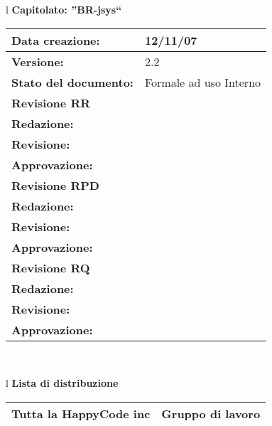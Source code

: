 

\newcommand{\lv}{ 2.2 } %
\newcommand{\dt}{ Norme Di Progetto }%



\begin{center}
\thispagestyle{plain}
\begin{table}[htbp]
\large{
\begin{tabular}{l}
\Large{\textbf{\textsf{Capitolato: ''BR-jsys``}}} \\
\begin{tabular}{|p{6cm}|p{6cm}|}
\hline
\textbf{Data creazione:} & 12/11/07 \\
\hline
\textbf{Versione:} & \lv \\ \hline
\textbf{Stato del documento:} & Formale ad uso Interno \\ \hline
\textbf{Revisione RR} &      \\ \hline
\textbf{Redazione:} & \FC \\ \hline
\textbf{Revisione:} & \MT \\ \hline
\textbf{Approvazione:}  & \ET \\ \hline
\textbf{Revisione RPD} & \\ \hline
\textbf{Redazione:} & \ET \\ \hline
\textbf{Revisione:} & \FC \\ \hline
\textbf{Approvazione:} & \MM \\ \hline
\textbf{Revisione RQ} & \\ \hline
\textbf{Redazione:} & \MT \\ \hline
\textbf{Revisione:} &  \\ \hline
\textbf{Approvazione:} &  \\ \hline
\end{tabular} \\
\end{tabular}
}
\end{table}

\begin{table}[hbtp]
\large{
\begin{tabular}{l}
\Large{\textbf{\textsf{Lista di distribuzione}}} \\
\begin{tabular}{|p{6cm}|p{6cm}|} \hline
{Tutta la HappyCode inc}& Gruppo di lavoro \\ \hline
\end{tabular} \\
\end{tabular}
}
\end{table}


\end{center}
